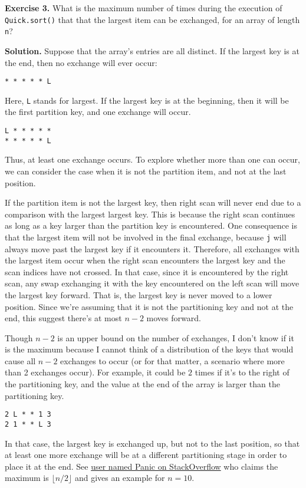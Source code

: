 \documentclass[12pt, a4paper]{article}
\newenvironment{ex}[2][Exercise]
{\par\medskip\noindent \textbf{#1 #2.}}
{\medskip}
\newenvironment{sol}[1][Solution]
{\par\medskip\noindent \textbf{#1.} }
{\medskip}
\begin{document}
	\begin{ex}{3}
		What is the maximum number of times during the execution of \texttt{Quick.sort()}
		that that the largest item can be exchanged, for an array of length \texttt{n}?
	\end{ex}
	\begin{sol}
		Suppose that the array's entries are all distinct. If the largest key is at the end,
		then no exchange will ever occur:
		\begin{lstlisting}[language={}]
* * * * * L
		\end{lstlisting}
		Here, \texttt{L} stands for largest. If the largest key is at the beginning, then it
		will be the first partition key, and one exchange will occur.
		\begin{lstlisting}[language={}]
L * * * * *
* * * * * L
		\end{lstlisting}
		Thus, at least one exchange occurs. To explore whether more than one can occur,
		we can consider the case when it is not the partition item, and not at the last position.
		
		If the partition item is not the largest key, then right scan will never end due to
		a comparison with the largest largest key. This is because the right scan continues as
		long as a key larger than the partition key is encountered. One consequence
		is that the largest item will not be involved in the final exchange, because
		\texttt{j} will always move past the largest key if it encounters it. Therefore,
		all exchanges with the largest item occur when the right scan encounters the largest
		key and the scan indices have not crossed. In that case, since it is encountered
		by the right scan, any swap exchanging it with the key encountered on the left
		scan will move the largest key forward. That is, the largest key is never moved
		to a lower position. Since we're assuming that it is not the partitioning key
		and not at the end, this suggest there's at most $n-2$ moves forward.
		
		Though $n-2$ is an upper bound on the number of exchanges, I don't know if it is
		the maximum because I cannot think of a distribution of the keys that would cause
		all $n-2$ exchanges to occur (or for that matter, a scenario where more than
		2 exchanges occur). For example, it could be $2$ times if it's to the right
		of the partitioning key, and the value at the end of the array is larger than
		the partitioning key.
		\begin{lstlisting}[language={}]
2 L * * 1 3
2 1 * * L 3
		\end{lstlisting}
		In that case, the largest key is exchanged up, but not to the last position, so
		that at least one more exchange will be at a different partitioning stage in order
		to place it at the end. See \href{https://stackoverflow.com/a/47702552}{user named Panic
		on StackOverflow} who claims the maximum is $\lfloor n / 2\rfloor$ and gives an example
		for $n=10$.
	\end{sol}
\end{document}
